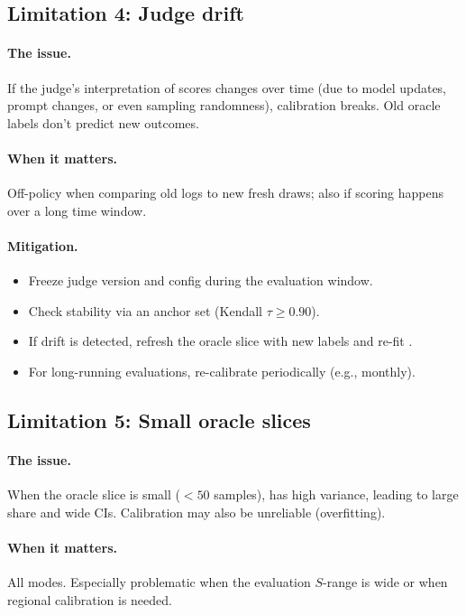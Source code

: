 \subsection{Limitation 4: Judge drift}

\paragraph{The issue.} If the judge's interpretation of scores changes over time (due to model updates, prompt changes, or even sampling randomness), calibration breaks. Old oracle labels don't predict new outcomes.

\paragraph{When it matters.} Off-policy when comparing old logs to new fresh draws; also \dm{} if scoring happens over a long time window.

\paragraph{Mitigation.}
\begin{itemize}
\item Freeze judge version and config during the evaluation window.
\item Check stability via an anchor set (Kendall $\tau \ge 0.90$).
\item If drift is detected, refresh the oracle slice with new labels and re-fit \autocal.
\item For long-running evaluations, re-calibrate periodically (e.g., monthly).
\end{itemize}

\subsection{Limitation 5: Small oracle slices}

\paragraph{The issue.} When the oracle slice is small ($< 50$ samples), \autocal{} has high variance, leading to large \oua{} share and wide CIs. Calibration may also be unreliable (overfitting).

\paragraph{When it matters.} All modes. Especially problematic when the evaluation $S$-range is wide or when regional calibration is needed.

